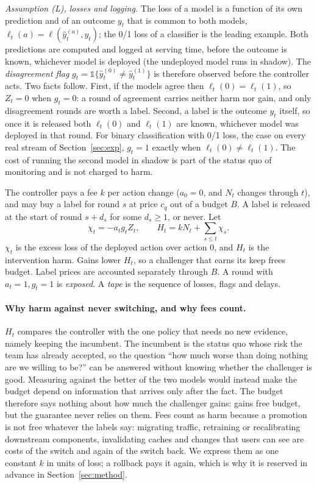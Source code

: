 \documentclass[10pt]{article}
\theoremstyle{plain}
\theoremstyle{definition}
\newcommand{\one}{\mathbb{1}}
\begin{document}
\emph{Assumption (L), losses and logging.} The loss of a model is a function of its own prediction and of an outcome $y_t$ that is common to both models, $\ell_t(a)=\ell(\hat y^{(a)}_t,y_t)$; the 0/1 loss of a classifier is the leading example. Both predictions are computed and logged at serving time, before the outcome is known, whichever model is deployed (the undeployed model runs in shadow). The \emph{disagreement flag} $g_t=\one\{\hat y^{(0)}_t\ne\hat y^{(1)}_t\}$ is therefore observed before the controller acts. Two facts follow. First, if the models agree then $\ell_t(0)=\ell_t(1)$, so $Z_t=0$ when $g_t=0$: a round of agreement carries neither harm nor gain, and only disagreement rounds are worth a label. Second, a label is the outcome $y_t$ itself, so once it is released both $\ell_t(0)$ and $\ell_t(1)$ are known, whichever model was deployed in that round. For binary classification with 0/1 loss, the case on every real stream of Section~\ref{sec:exp}, $g_t=1$ exactly when $\ell_t(0)\ne\ell_t(1)$. The cost of running the second model in shadow is part of the status quo of monitoring and is not charged to harm.

The controller pays a fee $k$ per action change ($a_0=0$, and $N_t$ changes through $t$), and may buy a label for round $s$ at price $c_q$ out of a budget $B$. A label is released at the start of round $s+d_s$ for some $d_s\ge1$, or never. Let
\begin{equation*}
\chi_t=-a_tg_tZ_t,\qquad H_t=kN_t+\sum_{s\le t}\chi_s .
\end{equation*}
$\chi_t$ is the excess loss of the deployed action over action $0$, and $H_t$ is the intervention harm. Gains lower $H_t$, so a challenger that earns its keep frees budget. Label prices are accounted separately through $B$. A round with $a_t=1,g_t=1$ is \emph{exposed}. A \emph{tape} is the sequence of losses, flags and delays.

\paragraph{Why harm against never switching, and why fees count.}
$H_t$ compares the controller with the one policy that needs no new evidence, namely keeping the incumbent. The incumbent is the status quo whose risk the team has already accepted, so the question ``how much worse than doing nothing are we willing to be?'' can be answered without knowing whether the challenger is good. Measuring against the better of the two models would instead make the budget depend on information that arrives only after the fact. The budget therefore says nothing about how much the challenger gains: gains free budget, but the guarantee never relies on them. Fees count as harm because a promotion is not free whatever the labels say: migrating traffic, retraining or recalibrating downstream components, invalidating caches and changes that users can see are costs of the switch and again of the switch back. We express them as one constant $k$ in units of loss; a rollback pays it again, which is why it is reserved in advance in Section~\ref{sec:method}.
\end{document}
